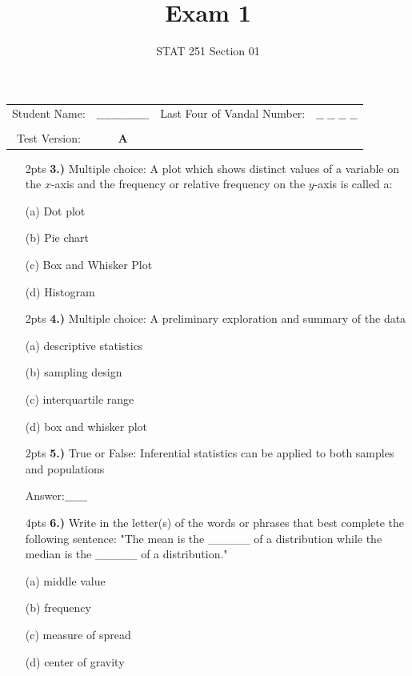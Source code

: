 \documentclass[
]{article}
\title{Exam 1}
\author{STAT 251 Section 01}
\date{}
\begin{document}
\maketitle

\begin{table}
\centering
\begin{tabular}{cccc}

Student Name: & $\_\_\_\_\_\_\_\_\_\_\_\_\_\_$ & Last Four of Vandal Number:  & $\_\_$ $\_\_$ $\_\_$ $\_\_$ \\
&&& \\
Test Version: & \textbf{A} && \\

\end{tabular}
\end{table}

\newpage

\begin{enumerate}
\item[ 2pts \bf 3.)]{Multiple choice: A plot which shows distinct values of a variable on the $x$-axis and the frequency or relative frequency on the $y$-axis is called a:}
\item[(a)]{Dot plot}
\item[(b)]{Pie chart}
\item[(c)]{Box and Whisker Plot}
\item[(d)]{Histogram}
\end{enumerate}

\newpage
\begin{enumerate}
\item[2pts \bf 4.)]{Multiple choice: A preliminary exploration and summary of the data}
\item[(a)]{descriptive statistics}
\item[(b)]{sampling design}
\item[(c)]{interquartile range}
\item[(d)]{box and whisker plot}
\end{enumerate}

\begin{enumerate} 
  \item[2pts \bf 5.)]{True or False: Inferential statistics can be applied to both samples and populations}
  \item[] Answer:$\_\_\_\_\_\_$
\end{enumerate}

\begin{enumerate} 
  \item[4pts \bf 6.)]{Write in the letter(s) of the words or phrases that best complete the following sentence: "The mean is the \_\_\_\_\_ of a distribution while the median is the \_\_\_\_\_ of a distribution."}
  \item[(a)] middle value
  \item[(b)] frequency
  \item[(c)] measure of spread
  \item[(d)] center of gravity
\end{enumerate}
\end{document}

